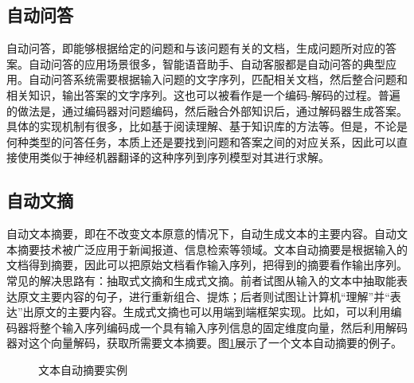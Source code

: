 
\subsection{自动问答}

\parinterval 自动问答，即能够根据给定的问题和与该问题有关的文档，生成问题所对应的答案。自动问答的应用场景很多，智能语音助手、自动客服都是自动问答的典型应用。自动问答系统需要根据输入问题的文字序列，匹配相关文档，然后整合问题和相关知识，输出答案的文字序列。这也可以被看作是一个编码-解码的过程。普遍的做法是，通过编码器对问题编码，然后融合外部知识后，通过解码器生成答案。具体的实现机制有很多，比如基于阅读理解、基于知识库的方法等。但是，不论是何种类型的问答任务，本质上还是要找到问题和答案之间的对应关系，因此可以直接使用类似于神经机器翻译的这种序列到序列模型对其进行求解。


\subsection{自动文摘}
\parinterval 自动文本摘要，即在不改变文本原意的情况下，自动生成文本的主要内容。自动文本摘要技术被广泛应用于新闻报道、信息检索等领域。文本自动摘要是根据输入的文档得到摘要，因此可以把原始文档看作输入序列，把得到的摘要看作输出序列。常见的解决思路有：抽取式文摘和生成式文摘。前者试图从输入的文本中抽取能表达原文主要内容的句子，进行重新组合、提炼；后者则试图让计算机``理解''并``表达''出原文的主要内容。生成式文摘也可以用端到端框架实现。比如，可以利用编码器将整个输入序列编码成一个具有输入序列信息的固定维度向量，然后利用解码器对这个向量解码，获取所需要文本摘要\cite{DBLP:journals/corr/RushCW15}。图\ref{fig:6-57}展示了一个文本自动摘要的例子\cite{DBLP:journals/corr/PaulusXS17}。

\begin{figure}[htp]
    \centering

\caption{文本自动摘要实例}
   \label{fig:6-57}
\end{figure}




